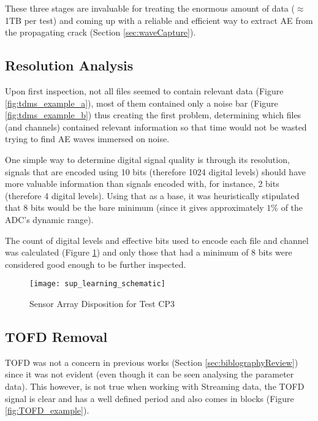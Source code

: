 These three stages are invaluable for treating the enormous amount of data ($\approx$ 1TB per test) and coming up with a reliable and efficient way to extract AE from the propagating crack (Section \ref{sec:waveCapture}). 

\subsection{Resolution Analysis}\label{sec:resAnalysis}

Upon first inspection, not all files seemed to contain relevant data (Figure \ref{fig:tdms_example_a}), most of them contained only a noise bar (Figure \ref{fig:tdms_example_b}) thus creating the first problem, determining which files (and channels) contained relevant information so that time would not be wasted trying to find AE waves immersed on noise.

One simple way to determine digital signal quality is through its resolution, signals that are encoded using 10 bits (therefore 1024 digital levels) should have more valuable information than signals encoded with, for instance, 2 bits (therefore 4 digital levels). Using that as a base, it was heuristically stipulated that 8 bits would be the bare minimum (since it gives approximately $1\%$ of the ADC's dynamic range).

The count of digital levels and effective bits used to encode each file and channel was calculated (Figure \ref{fig:res_analysis_example}) and only those that had a minimum of 8 bits were considered good enough to be further inspected.

\begin{figure}[H]
	\centering
	\texttt{[image: sup\_learning\_schematic]}
	\caption{Sensor Array Disposition for Test CP3}
	\label{fig:res_analysis_example}
\end{figure}

\subsection{TOFD Removal} \label{sec:TOFDRemoval}


TOFD was not a concern in previous works (Section \ref{sec:biblographyReview}) since it was not evident (even though it can be seen analysing the parameter data). This however, is not true when working with Streaming data, the TOFD signal is clear and has a well defined period and also comes in blocks (Figure \ref{fig:TOFD_example}).

